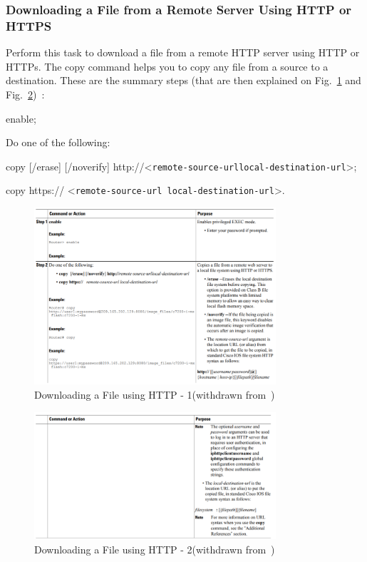 \subsubsection{Downloading a File from a Remote Server Using HTTP or HTTPS}
Perform this task to download a file from a remote HTTP server using HTTP or HTTPs. The copy command helps you to copy any file from a source to a destination. These are the summary steps (that are then explained on Fig.~\ref{fig:download-http-1} and Fig.~\ref{fig:download-http-2})~\cite{http-example-cisco}:
%
\begin{enum-c}
\item enable;
\item Do one of the following:
	\begin{item-c}
	\item copy [/erase] [/noverify] http://<\texttt{remote-source-urllocal-destination-url}>;
	\item copy https:// <\texttt{remote-source-url local-destination-url}>.
	\end{item-c}
\end{enum-c}
%
\begin{figure}[!hbt]
\centering
    \includegraphics[width=0.8\textwidth]{./img/download-http-1.png}
  \caption{Downloading a File using HTTP - 1(withdrawn from~\cite{http-example-cisco})}%
\label{fig:download-http-1}
\end{figure}
%
\begin{figure}[!hbt]
\centering
    \includegraphics[width=0.8\textwidth]{./img/download-http-2.png}
  \caption{Downloading a File using HTTP - 2(withdrawn from~\cite{http-example-cisco})}%
\label{fig:download-http-2}
\end{figure}
%
